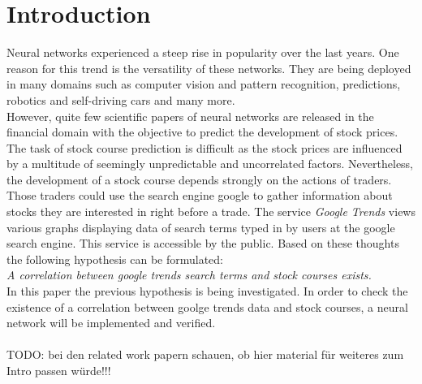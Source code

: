 \section{Introduction}
\label{sec:introduction}
Neural networks experienced a steep rise in popularity over the last years. One reason for this trend is the versatility of these networks. They are being deployed in many domains such as computer vision and pattern recognition, predictions, robotics and self-driving cars and many more. 
\\
However, quite few scientific papers of neural networks are released in the financial domain with the objective to predict the development of stock prices. 
The task of stock course prediction is difficult as the stock prices are influenced by a multitude of seemingly unpredictable and uncorrelated factors. Nevertheless, the development of a stock course depends strongly on the actions of traders. Those traders could use the search engine google to gather information about stocks they are interested in right before a trade. The service \textit{Google Trends} views various graphs displaying data of search terms typed in by users at the google search engine. This service is accessible by the public. Based on these thoughts the following hypothesis can be formulated: 
\\
\textit{A correlation between google trends search terms and stock courses exists. } 
\\
In this paper the previous hypothesis is being investigated. In order to check the existence of a correlation between goolge trends data and stock courses, a neural network will be implemented and verified. 
\\ \\
TODO: bei den related work papern schauen, ob hier material für weiteres zum Intro passen würde!!!
\\